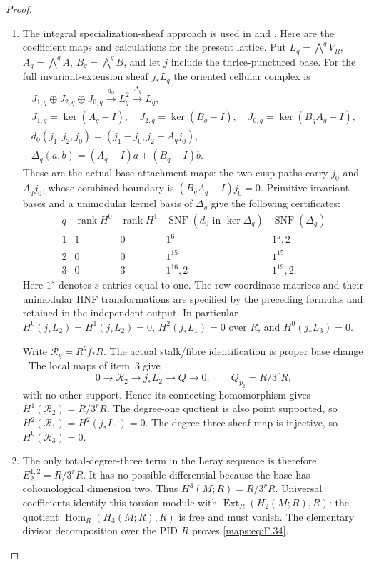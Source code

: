 \documentclass[11pt,a4paper]{article}
\theoremstyle{definition}
\begin{document}
\begin{proof}
\begin{enumerate}[label=\arabic*.]
\item The integral specialization-sheaf approach is used in
\cite[Lemma 7.25 and Propositions 7.26--7.27, pp.~61--63]{AC26}
and \cite[section ``The integral homology'']{E26}.
Here are the coefficient maps and calculations for the present lattice.  Put $L_q=\bigwedge^qV_R$, $A_q=\bigwedge^qA$,
$B_q=\bigwedge^qB$, and let $j$ include the thrice-punctured base.
For the full invariant-extension sheaf $j_*L_q$ the oriented
cellular complex is
\[
\begin{gathered}
 J_{1,q}\oplus J_{2,q}\oplus J_{0,q}
 \xrightarrow{d_0}L_q^2\xrightarrow{\Delta_q}L_q,\\
 J_{1,q}=\ker(A_q-I),\quad J_{2,q}=\ker(B_q-I),\quad
 J_{0,q}=\ker(B_qA_q-I),\\
 d_0(j_1,j_2,j_0)=(j_1-j_0,j_2-A_qj_0),\\
 \Delta_q(a,b)=(A_q-I)a+(B_q-I)b.
\end{gathered}
\]
These are the actual base attachment maps: the two cusp paths
carry $j_0$ and $A_qj_0$, whose combined boundary is
$(B_qA_q-I)j_0=0$.  Primitive invariant bases and a unimodular
kernel basis of $\Delta_q$ give the following certificates:
\[
\begin{array}{c|c|c|c|c}
q&\operatorname{rank}H^0&\operatorname{rank}H^1&
 \operatorname{SNF}(d_0\text{ in }\ker\Delta_q)&
 \operatorname{SNF}(\Delta_q)\\\hline
1&1&0&1^6&1^5,2\\
2&0&0&1^{15}&1^{15}\\
3&0&3&1^{16},2&1^{19},2.
\end{array}
\]
Here $1^s$ denotes $s$ entries equal to one.  The row-coordinate
matrices and their unimodular HNF transformations are specified
by the preceding formulas and retained in the independent output.
In particular $H^0(j_*L_2)=H^1(j_*L_2)=0$,
$H^2(j_*L_1)=0$ over $R$, and $H^0(j_*L_3)=0$.

Write $\mathcal R_q=R^qf_*R$.  The actual stalk/fibre
identification is proper base change
\cite[Tag 09V5, Lemma 20.18.1]{StacksProject}.
The local maps of item~3 give
\[
 0\longrightarrow\mathcal R_2\longrightarrow j_*L_2
 \longrightarrow Q\longrightarrow0,
 \qquad Q_{p_2}=R/3^rR,
\]
with no other support.  Hence its connecting homomorphism gives
$H^1(\mathcal R_2)=R/3^rR$.
The degree-one quotient is also point supported, so
$H^2(\mathcal R_1)=H^2(j_*L_1)=0$.
The degree-three sheaf map is injective, so
$H^0(\mathcal R_3)=0$.

\item The only total-degree-three term in the Leray sequence
\cite[Tag 01F2, Lemma 20.13.4]{StacksProject} is therefore
$E_2^{1,2}=R/3^rR$.  It has no possible differential because
the base has cohomological dimension two.  Thus
$H^3(M;R)=R/3^rR$.
Universal coefficients
\cite[Theorem 3.2, p.~195]{Hatcher2002} identify this torsion
module with $\operatorname{Ext}_R(H_2(M;R),R)$: the quotient
$\operatorname{Hom}_R(H_3(M;R),R)$ is free and must vanish.
The elementary divisor decomposition over the PID $R$ proves
\eqref{maps:eq:F.34}.


\end{enumerate}
\end{proof}
\end{document}
